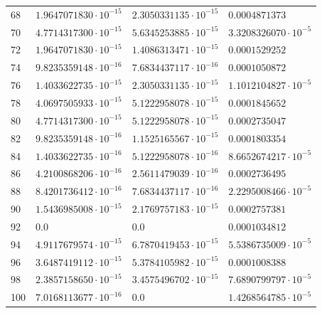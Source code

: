 \documentclass{article}
\begin{document}
\begin{table}[htb]
\begin{tabular}{|l|l|l|l|}
      68  & $1.9647071830 \cdot 10^{-15}$ & $2.3050331135 \cdot 10^{-15}$ & $0.0004871373$               \\
      70  & $4.7714317300 \cdot 10^{-15}$ & $5.6345253885 \cdot 10^{-15}$ & $3.3208326070 \cdot 10^{-5}$ \\
      72  & $1.9647071830 \cdot 10^{-15}$ & $1.4086313471 \cdot 10^{-15}$ & $0.0001529252$               \\
      74  & $9.8235359148 \cdot 10^{-16}$ & $7.6834437117 \cdot 10^{-16}$ & $0.0001050872$               \\
      76  & $1.4033622735 \cdot 10^{-15}$ & $2.3050331135 \cdot 10^{-15}$ & $1.1012104827 \cdot 10^{-5}$ \\
      78  & $4.0697505933 \cdot 10^{-15}$ & $5.1222958078 \cdot 10^{-15}$ & $0.0001845652$               \\
      80  & $4.7714317300 \cdot 10^{-15}$ & $5.1222958078 \cdot 10^{-15}$ & $0.0002735047$               \\
      82  & $9.8235359148 \cdot 10^{-16}$ & $1.1525165567 \cdot 10^{-15}$ & $0.0001803354$               \\
      84  & $1.4033622735 \cdot 10^{-16}$ & $5.1222958078 \cdot 10^{-16}$ & $8.6652674217 \cdot 10^{-5}$ \\
      86  & $4.2100868206 \cdot 10^{-16}$ & $2.5611479039 \cdot 10^{-16}$ & $0.0002736495$               \\
      88  & $8.4201736412 \cdot 10^{-16}$ & $7.6834437117 \cdot 10^{-16}$ & $2.2295008466 \cdot 10^{-5}$ \\
      90  & $1.5436985008 \cdot 10^{-15}$ & $2.1769757183 \cdot 10^{-15}$ & $0.0002757381$               \\
      92  & $0.0$                         & $0.0$                         & $0.0001034812$               \\
      94  & $4.9117679574 \cdot 10^{-15}$ & $6.7870419453 \cdot 10^{-15}$ & $5.5386735009 \cdot 10^{-5}$ \\
      96  & $3.6487419112 \cdot 10^{-15}$ & $5.3784105982 \cdot 10^{-15}$ & $0.0001008388$               \\
      98  & $2.3857158650 \cdot 10^{-15}$ & $3.4575496702 \cdot 10^{-15}$ & $7.6890799797 \cdot 10^{-5}$ \\
      100 & $7.0168113677 \cdot 10^{-16}$ & $0.0$                         & $1.4268564785 \cdot 10^{-5}$ \\ \hline

    \end{tabular}
  \end{table}
\end{document}
